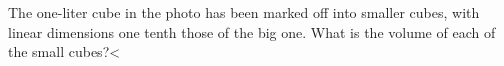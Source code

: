 The one-liter cube in the photo has been marked off into smaller
cubes, with linear dimensions one tenth those of the big one.
What is the volume of each of the small cubes?<%

